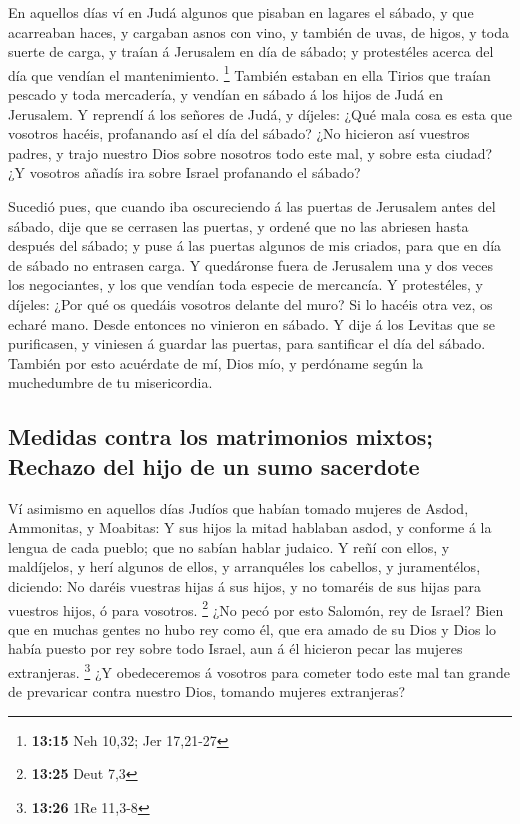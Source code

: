  En aquellos días ví en Judá algunos que pisaban en lagares
el sábado, y que acarreaban haces, y cargaban asnos con vino, y también
de uvas, de higos, y toda suerte de carga, y traían á Jerusalem en día
de sábado; y protestéles acerca del día que vendían el mantenimiento.
\footnote{\textbf{13:15} Neh 10,32; Jer 17,21-27}  También
estaban en ella Tirios que traían pescado y toda mercadería, y vendían
en sábado á los hijos de Judá en Jerusalem.  Y reprendí á
los señores de Judá, y díjeles: ¿Qué mala cosa es esta que vosotros
hacéis, profanando así el día del sábado?  ¿No hicieron así
vuestros padres, y trajo nuestro Dios sobre nosotros todo este mal, y
sobre esta ciudad? ¿Y vosotros añadís ira sobre Israel profanando el
sábado?

 Sucedió pues, que cuando iba oscureciendo á las puertas de
Jerusalem antes del sábado, dije que se cerrasen las puertas, y ordené
que no las abriesen hasta después del sábado; y puse á las puertas
algunos de mis criados, para que en día de sábado no entrasen carga.
 Y quedáronse fuera de Jerusalem una y dos veces los
negociantes, y los que vendían toda especie de mercancía. 
Y protestéles, y díjeles: ¿Por qué os quedáis vosotros delante del muro?
Si lo hacéis otra vez, os echaré mano. Desde entonces no vinieron en
sábado.  Y dije á los Levitas que se purificasen, y
viniesen á guardar las puertas, para santificar el día del sábado.
También por esto acuérdate de mí, Dios mío, y perdóname según la
muchedumbre de tu misericordia.

\hypertarget{medidas-contra-los-matrimonios-mixtos-rechazo-del-hijo-de-un-sumo-sacerdote}{%
\subsection{Medidas contra los matrimonios mixtos; Rechazo del hijo de
un sumo
sacerdote}\label{medidas-contra-los-matrimonios-mixtos-rechazo-del-hijo-de-un-sumo-sacerdote}}

 Ví asimismo en aquellos días Judíos que habían tomado
mujeres de Asdod, Ammonitas, y Moabitas:  Y sus hijos la
mitad hablaban asdod, y conforme á la lengua de cada pueblo; que no
sabían hablar judaico.  Y reñí con ellos, y maldíjelos, y
herí algunos de ellos, y arranquéles los cabellos, y juramentélos,
diciendo: No daréis vuestras hijas á sus hijos, y no tomaréis de sus
hijas para vuestros hijos, ó para vosotros. \footnote{\textbf{13:25}
  Deut 7,3}  ¿No pecó por esto Salomón, rey de Israel? Bien
que en muchas gentes no hubo rey como él, que era amado de su Dios y
Dios lo había puesto por rey sobre todo Israel, aun á él hicieron pecar
las mujeres extranjeras. \footnote{\textbf{13:26} 1Re 11,3-8}
 ¿Y obedeceremos á vosotros para cometer todo este mal tan
grande de prevaricar contra nuestro Dios, tomando mujeres extranjeras?

